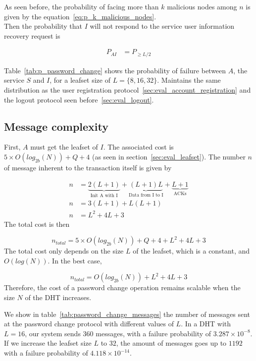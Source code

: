    As seen before, the probability of facing more than $k$ malicious nodes among
$n$ is given by the equation~\ref{eq:p_k_malicious_nodes}.\\

    Then the probability that $I$ will not respond to the service user
information recovery request is

    \begin{align}
      P_{AI} &= P_{\ge L/2}
    \end{align}


    Table~\eqref{tab:p_password_change} shows the probability of failure
between $A$, the service $S$ and $I$, for a leafset size of $L = \{8,16,32\}$.
Maintains the same distribution as the user registration
protocol~\ref{sec:eval_account_registration} and the
logout protocol seen before~\ref{sec:eval_logout}.

  \subsection{Message complexity}

    First, $A$ must get the leafset of $I$. The associated cost is $5
\times O(log_{2b}(N)) + Q + 4$ (as seen in section~\ref{sec:eval_leafset}).
    The number $n$ of message inherent to the transaction itself is given by

    \begin{align}
      n &= \underbrace{2(L+1)}_\text{Init A with I} +
           \underbrace{(L+1)L}_\text{Data from I to I} +
           \underbrace{L+1}_\text{ACKs}\\
      n &= 3(L+1) + L(L+1)\\
      n &= L^2 + 4L + 3
    \end{align}
     The total cost is then

    $$
      n_{total} = 5 \times O(log_{2b}(N)) + Q + 4 +  L^2 + 4L + 3
    $$    
    The total cost only depends on the size $L$ of the leafset, which is a
constant, and $O(log(N))$. In the best case, 

    $$
      n_{total} = O(log_{2b}(N)) + L^2 + 4L + 3
    $$
    Therefore, the cost of a password change operation remains
scalable when the size $N$ of the DHT increases.

    We show in table~\ref{tab:password_change_messages} the number of messages sent at
the password change protocol with different values of $L$. In a DHT with
$L = 16$, our system sends $360$ messages, with a failure probability of
 $3.287 \times 10^{-8}$. If we increase the leafset size $L$ to $32$, the amount of
messages goes up to $1192$ with a failure probability of $4.118 \times 10^{-14}$.

